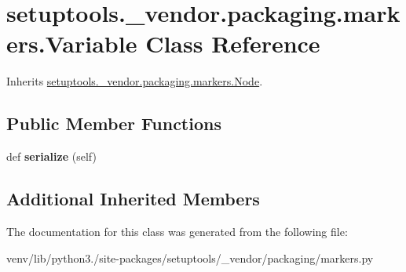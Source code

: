 \hypertarget{classsetuptools_1_1__vendor_1_1packaging_1_1markers_1_1_variable}{}\section{setuptools.\+\_\+vendor.\+packaging.\+markers.\+Variable Class Reference}
\label{classsetuptools_1_1__vendor_1_1packaging_1_1markers_1_1_variable}


Inherits \hyperlink{classsetuptools_1_1__vendor_1_1packaging_1_1markers_1_1_node}{setuptools.\+\_\+vendor.\+packaging.\+markers.\+Node}.

\subsection*{Public Member Functions}
\begin{DoxyCompactItemize}
\item 
\mbox{\label{classsetuptools_1_1__vendor_1_1packaging_1_1markers_1_1_variable_a5010ba4eec07cc606f2bffec67144145}} 
def {\bfseries serialize} (self)
\end{DoxyCompactItemize}
\subsection*{Additional Inherited Members}


The documentation for this class was generated from the following file\+:\begin{DoxyCompactItemize}
\item 
venv/lib/python3./site-\/packages/setuptools/\+\_\+vendor/packaging/markers.\+py\end{DoxyCompactItemize}
